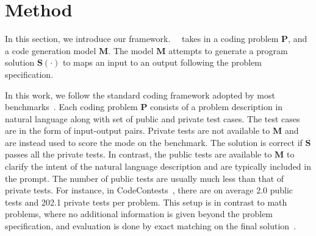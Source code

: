\section{Method}
\label{sec:method}
In this section, we introduce our framework. ~\frameworkname~takes in a coding problem $\mathbf{P}$, and a code generation model $\mathbf{M}$. 
The model $\mathbf{M}$ attempts to generate a program solution $\mathbf{S(\cdot)}$ to maps an input to an output following the problem specification.%

In this work, we follow the standard coding framework adopted by most benchmarks~\citep{chen2021evaluating, li2022competition, li2023taco, jain2024livecodebench, hendrycksapps2021, gulwani4foundations}.
Each coding problem $\mathbf{P}$ consists of a problem description in natural language along with set of public and private test cases. 
The test cases are in the form of input-output pairs. 
Private tests are not available to $\mathbf{M}$ and are instead used to score the mode on the benchmark. 
The solution is correct if $\mathbf{S}$ passes all the private tests. In contrast, the public tests are available to $\mathbf{M}$ to clarify the intent of the natural language description and are typically included in the prompt. The number of public tests are usually much less than that of private tests. For instance, in CodeContests~\citep{li2022competition}, there are on average 2.0 public tests and 202.1 private tests per problem.
This setup is in contrast to math problems, where no additional information is given beyond the problem specification, and evaluation is done by exact matching on the final solution~\citep{li2024numinamath}.




